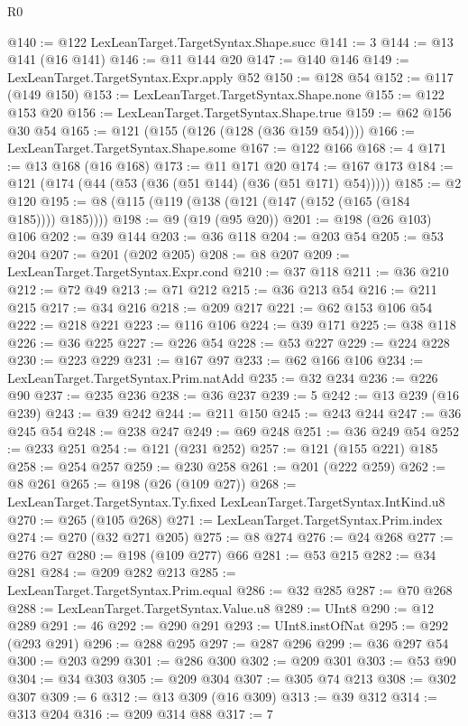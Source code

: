 \begin{lexlean}{R0}
\begin{coremodule}
{{{{{{{{{{{{{{{{{{{@140 := @122 LexLeanTarget.TargetSyntax.Shape.succ
@141 := 3
@144 := @13 @141 (@16 @141)
@146 := @11 @144 @20
@147 := @140 @146
@149 := LexLeanTarget.TargetSyntax.Expr.apply @52
@150 := @128 @54
@152 := @117 (@149 @150)
@153 := LexLeanTarget.TargetSyntax.Shape.none
@155 := @122 @153 @20
@156 := LexLeanTarget.TargetSyntax.Shape.true
@159 := @62 @156 @30 @54
@165 := @121 (@155 (@126 (@128 (@36 @159 @54))))
@166 := LexLeanTarget.TargetSyntax.Shape.some
@167 := @122 @166
@168 := 4
@171 := @13 @168 (@16 @168)
@173 := @11 @171 @20
@174 := @167 @173
@184 := @121 (@174 (@44 (@53 (@36 (@51 @144) (@36 (@51 @171) @54)))))
@185 := @2 @120
@195 := @8 (@115 (@119 (@138 (@121 (@147 (@152 (@165 (@184 @185)))) @185))))
@198 := @9 (@19 (@95 @20))
@201 := @198 (@26 @103) @106
@202 := @39 @144
@203 := @36 @118
@204 := @203 @54
@205 := @53 @204
@207 := @201 (@202 @205)
@208 := @8 @207
@209 := LexLeanTarget.TargetSyntax.Expr.cond
@210 := @37 @118
@211 := @36 @210
@212 := @72 @49
@213 := @71 @212
@215 := @36 @213 @54
@216 := @211 @215
@217 := @34 @216
@218 := @209 @217
@221 := @62 @153 @106 @54
@222 := @218 @221
@223 := @116 @106
@224 := @39 @171
@225 := @38 @118
@226 := @36 @225
@227 := @226 @54
@228 := @53 @227
@229 := @224 @228
@230 := @223 @229
@231 := @167 @97
@233 := @62 @166 @106
@234 := LexLeanTarget.TargetSyntax.Prim.natAdd
@235 := @32 @234
@236 := @226 @90
@237 := @235 @236
@238 := @36 @237
@239 := 5
@242 := @13 @239 (@16 @239)
@243 := @39 @242
@244 := @211 @150
@245 := @243 @244
@247 := @36 @245 @54
@248 := @238 @247
@249 := @69 @248
@251 := @36 @249 @54
@252 := @233 @251
@254 := @121 (@231 @252)
@257 := @121 (@155 @221) @185
@258 := @254 @257
@259 := @230 @258
@261 := @201 (@222 @259)
@262 := @8 @261
@265 := @198 (@26 (@109 @27))
@268 := LexLeanTarget.TargetSyntax.Ty.fixed LexLeanTarget.TargetSyntax.IntKind.u8
@270 := @265 (@105 @268)
@271 := LexLeanTarget.TargetSyntax.Prim.index
@274 := @270 (@32 @271 @205)
@275 := @8 @274
@276 := @24 @268
@277 := @276 @27
@280 := @198 (@109 @277) @66
@281 := @53 @215
@282 := @34 @281
@284 := @209 @282 @213
@285 := LexLeanTarget.TargetSyntax.Prim.equal
@286 := @32 @285
@287 := @70 @268
@288 := LexLeanTarget.TargetSyntax.Value.u8
@289 := UInt8
@290 := @12 @289
@291 := 46
@292 := @290 @291
@293 := UInt8.instOfNat
@295 := @292 (@293 @291)
@296 := @288 @295
@297 := @287 @296
@299 := @36 @297 @54
@300 := @203 @299
@301 := @286 @300
@302 := @209 @301
@303 := @53 @90
@304 := @34 @303
@305 := @209 @304
@307 := @305 @74 @213
@308 := @302 @307
@309 := 6
@312 := @13 @309 (@16 @309)
@313 := @39 @312
@314 := @313 @204
@316 := @209 @314 @88
@317 := 7
}}}}}}}}}}}}}}}}}}}
\end{coremodule}
\end{lexlean}
